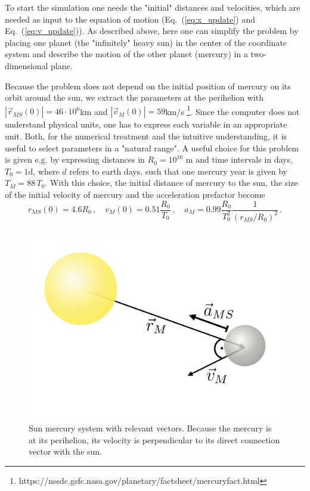 \documentclass[12pt]{iopart}
\newcommand{\abs}[1]{\left\vert #1 \right\vert}
\begin{document}
To start the simulation one needs the "initial" distances and velocities, which are needed as input to the equation of motion (Eq.~(\ref{eq:x_update}) and Eq.~(\ref{eq:v_update})).  As described above, here  one can simplify the problem by placing one planet (the "infinitely" heavy sun) in the center of the coordinate system and describe the motion of the other planet (mercury) in a two-dimensional plane.  

Because the problem does not depend on the initial position of mercury on its orbit around the sun, we extract the parameters at the perihelion with $ \abs{\vec r_{MS}(0)} = 46 \cdot 10^6$km and $ \abs{\vec v_M(0)} = 59$km/s \footnote{https://nssdc.gsfc.nasa.gov/planetary/factsheet/mercuryfact.html}.  Since the computer does not understand physical units, one has to express each variable in an appropriate unit.  Both, for the numerical treatment and the intuitive understanding, it is useful to select parameters in a "natural range".  A useful choice for this problem is given e.g. by expressing distances in $R_0 = 10^{10}$ m and time intervals in days, $T_0 = 1$d, where $d$ refers to earth days, such that one mercury year is given by $T_M=88\,T_0$.  With this choice, the initial distance of mercury to the sun, the size of the initial velocity of mercury and the acceleration prefactor become
\begin{equation}
r_{MS}(0) = 4.6 R_0 \, , \quad
v_{M}(0)  = 0.51 \frac{R_0}{T_0} \, ,  \quad
a_M       = 0.99 \frac{R_0}{T_0^2} \frac{1}{\left(r_{MS}/R_0\right)^2} 
\, .
\end{equation}

%
\begin{figure}[htb]
	\centering
	\includegraphics[width=.4\textwidth]{figs/sun_merc.pdf}
	\caption{\label{fig:sun_merc}Sun mercury system with relevant vectors.  Because the mercury is at its perihelion, its velocity is perpendicular to its direct connection vector with the sun.}
\end{figure}
%
\end{document}
